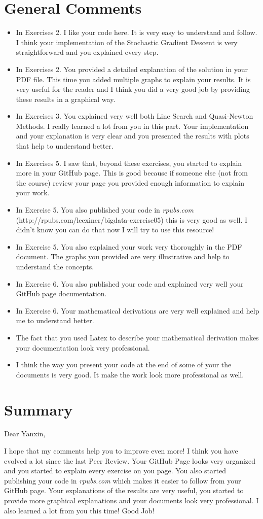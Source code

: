 \documentclass[11 pt]{article}
\begin{document}
\section{General Comments}
\begin{itemize}
	\item In Exercises 2. I like your code here. It is very easy to understand and follow. I think your implementation of the Stochastic Gradient Descent is very straightforward and you explained every step. 
	\item In Exercises 2. You provided a detailed explanation of the solution in your PDF file. This time you added multiple graphs to explain your results. It is very useful for the reader and I think you did a very good job by providing these results in a graphical way.
	\item In Exercises 3. You explained very well both Line Search and Quasi-Newton Methods. I really learned a lot from you in this part. Your implementation and your explanation is very clear and you presented the results with plots that help to understand better.
	\item In Exercises 5. I saw that, beyond these exercises,  you started to explain more in your GitHub page. This is good because if someone else (not from the course) review your page you provided enough information to explain your work. 
	\item In Exercise 5. You also published your code in \textit{rpubs.com} (http://rpubs.com/leexiner/bigdata-exercise05) this is very good as well. I didn't know you can do that now I will try to use this resource! 
	\item In Exercise 5. You also explained your work very thoroughly in the PDF document. The graphs you provided are very illustrative and help to understand the concepts.  
	\item In Exercise 6. You also published your code and explained very well your GitHub page documentation. 
	\item In Exercise 6. Your mathematical derivations are very well explained and help me to understand better.
	\item The fact that you used Latex to describe your mathematical derivation makes your documentation look very professional.
	\item I think the way you present your code at the end of some of your the documents is very good. It make the work look more professional as well.
\end{itemize}

\section{Summary}
Dear Yanxin, 

I hope that my comments help you to improve even more! I think you have evolved a lot since the last Peer Review. Your GitHub Page looks very organized and you started to explain every exercise on you page. You also started publishing your code in \textit{rpubs.com} which makes it easier to follow from your GitHub page. Your explanations of the results are very useful, you started to provide more graphical explanations and your documents look very professional. I also learned a lot from you this time! 
Good Job!
\end{document}
